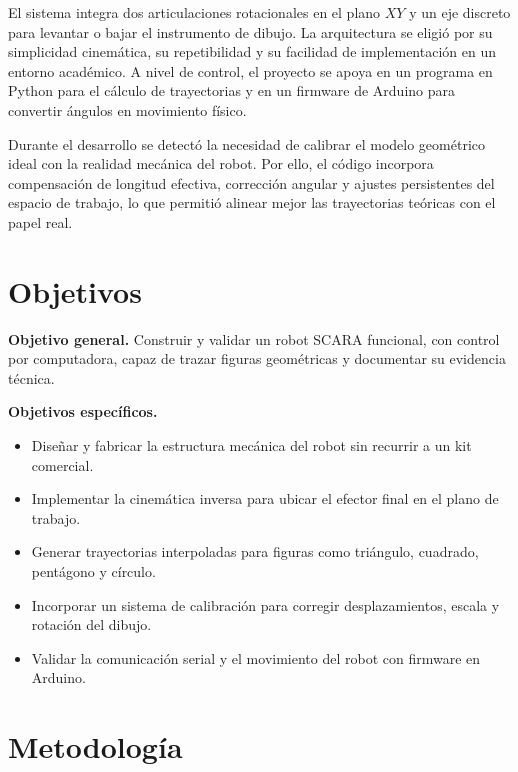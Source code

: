 \documentclass[11pt,letterpaper,onecolumn]{article}
\begin{document}
El sistema integra dos articulaciones rotacionales en el plano $XY$ y un eje discreto para levantar o bajar el instrumento de dibujo. La arquitectura se eligió por su simplicidad cinemática, su repetibilidad y su facilidad de implementación en un entorno académico. A nivel de control, el proyecto se apoya en un programa en Python para el cálculo de trayectorias y en un firmware de Arduino para convertir ángulos en movimiento físico.

Durante el desarrollo se detectó la necesidad de calibrar el modelo geométrico ideal con la realidad mecánica del robot. Por ello, el código incorpora compensación de longitud efectiva, corrección angular y ajustes persistentes del espacio de trabajo, lo que permitió alinear mejor las trayectorias teóricas con el papel real.



\section{Objetivos}
\justify

\textbf{Objetivo general.} Construir y validar un robot SCARA funcional, con control por computadora, capaz de trazar figuras geométricas y documentar su evidencia técnica.

\vspace{0.2cm}

\textbf{Objetivos específicos.}
\begin{itemize}
  \item Diseñar y fabricar la estructura mecánica del robot sin recurrir a un kit comercial.
  \item Implementar la cinemática inversa para ubicar el efector final en el plano de trabajo.
  \item Generar trayectorias interpoladas para figuras como triángulo, cuadrado, pentágono y círculo.
  \item Incorporar un sistema de calibración para corregir desplazamientos, escala y rotación del dibujo.
  \item Validar la comunicación serial y el movimiento del robot con firmware en Arduino.
\end{itemize}



\section{Metodología}
\justify
\end{document}
